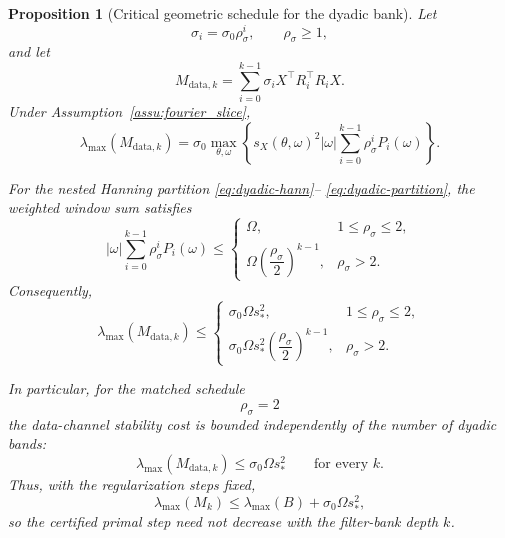 \documentclass{article}
\newtheorem{proposition}[theorem]{Proposition}
\begin{document}
\begin{proposition}[Critical geometric schedule for the dyadic bank]
\label{prop:dyadic-depth}
Let
\[
\sigma_i=\sigma_0\rho_\sigma^i,
\qquad
\rho_\sigma\ge1,
\]
and let
\[
M_{\mathrm{data},k}
=
\sum_{i=0}^{k-1}
\sigma_iX^\top R_i^\top R_iX.
\]
Under Assumption~\ref{assu:fourier_slice},
\begin{equation}
\label{eq:dyadic-spectrum-exact}
\lambda_{\max}(M_{\mathrm{data},k})
=
\sigma_0
\max_{\theta,\omega}
\left\{
s_X(\theta,\omega)^2
|\omega|
\sum_{i=0}^{k-1}
\rho_\sigma^iP_i(\omega)
\right\}.
\end{equation}

For the nested Hanning partition \eqref{eq:dyadic-hann}--%
\eqref{eq:dyadic-partition}, the weighted window sum satisfies
\begin{equation}
\label{eq:weighted-window-bound}
|\omega|
\sum_{i=0}^{k-1}\rho_\sigma^iP_i(\omega)
\le
\begin{cases}
\Omega,
& 1\le\rho_\sigma\le2,
\\[0.4em]
\Omega
\left(\dfrac{\rho_\sigma}{2}\right)^{k-1},
& \rho_\sigma>2.
\end{cases}
\end{equation}
Consequently,
\begin{equation}
\label{eq:dyadic-depth-bound}
\lambda_{\max}(M_{\mathrm{data},k})
\le
\begin{cases}
\sigma_0\Omega s_*^2,
& 1\le\rho_\sigma\le2,
\\[0.4em]
\sigma_0\Omega s_*^2
\left(\dfrac{\rho_\sigma}{2}\right)^{k-1},
& \rho_\sigma>2.
\end{cases}
\end{equation}

In particular, for the matched schedule
\[
\boxed{\rho_\sigma=2}
\]
the data-channel stability cost is bounded independently of the
number of dyadic bands:
\begin{equation}
\label{eq:dyadic-k-independent}
\lambda_{\max}(M_{\mathrm{data},k})
\le
\sigma_0\Omega s_*^2
\qquad
\text{for every }k.
\end{equation}
Thus, with the regularization steps fixed,
\begin{equation}
\label{eq:dyadic-total-bound}
\lambda_{\max}(M_k)
\le
\lambda_{\max}(B)
+
\sigma_0\Omega s_*^2,
\end{equation}
so the certified primal step need not decrease with the filter-bank
depth $k$.
\end{proposition}
\end{document}
